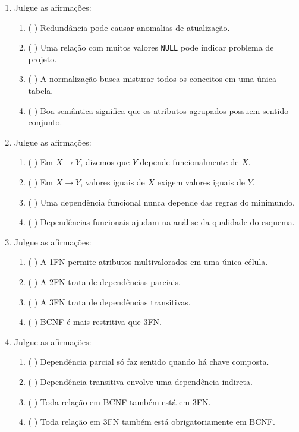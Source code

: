 \documentclass[12pt,a4paper]{article}
\begin{document}
\begin{enumerate}[resume,label=\textbf{Q\arabic*.}]

\item Julgue as afirmações:

\begin{enumerate}[label=\alph*)]
    \item ( \quad ) Redundância pode causar anomalias de atualização.
    \item ( \quad ) Uma relação com muitos valores \texttt{NULL} pode indicar problema de projeto.
    \item ( \quad ) A normalização busca misturar todos os conceitos em uma única tabela.
    \item ( \quad ) Boa semântica significa que os atributos agrupados possuem sentido conjunto.
\end{enumerate}

\item Julgue as afirmações:

\begin{enumerate}[label=\alph*)]
    \item ( \quad ) Em $X \rightarrow Y$, dizemos que $Y$ depende funcionalmente de $X$.
    \item ( \quad ) Em $X \rightarrow Y$, valores iguais de $X$ exigem valores iguais de $Y$.
    \item ( \quad ) Uma dependência funcional nunca depende das regras do minimundo.
    \item ( \quad ) Dependências funcionais ajudam na análise da qualidade do esquema.
\end{enumerate}

\item Julgue as afirmações:

\begin{enumerate}[label=\alph*)]
    \item ( \quad ) A 1FN permite atributos multivalorados em uma única célula.
    \item ( \quad ) A 2FN trata de dependências parciais.
    \item ( \quad ) A 3FN trata de dependências transitivas.
    \item ( \quad ) BCNF é mais restritiva que 3FN.
\end{enumerate}

\item Julgue as afirmações:

\begin{enumerate}[label=\alph*)]
    \item ( \quad ) Dependência parcial só faz sentido quando há chave composta.
    \item ( \quad ) Dependência transitiva envolve uma dependência indireta.
    \item ( \quad ) Toda relação em BCNF também está em 3FN.
    \item ( \quad ) Toda relação em 3FN também está obrigatoriamente em BCNF.
\end{enumerate}


\end{enumerate}
\end{document}

